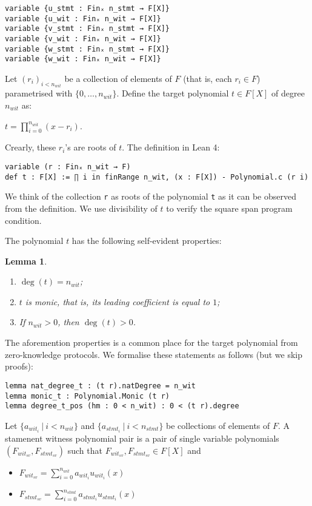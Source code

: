 \documentclass{article}
\newtheorem{lemma}{Lemma}
\theoremstyle{definition}
\theoremstyle{remark}
\begin{document}
\begin{lstlisting}
variable {u_stmt : Finₓ n_stmt → F[X]}
variable {u_wit : Finₓ n_wit → F[X]}
variable {v_stmt : Finₓ n_stmt → F[X]}
variable {v_wit : Finₓ n_wit → F[X]}
variable {w_stmt : Finₓ n_stmt → F[X]}
variable {w_wit : Finₓ n_wit → F[X]}
\end{lstlisting}

Let $(r_i)_{i < n_{wit}}$ be a collection of elements of $F$ (that is, each $r_i \in F$) parametrised with $\{0, \dots, n_{wit} \}$.
Define the target polynomial $t \in F[X]$ of degree $n_{wit}$ as:
\begin{center}
$t = \prod \limits_{i = 0}^{n_{wit}} (x - r_i)$.
\end{center}

Crearly, these $r_i$'s are roots of $t$. The definition in Lean 4:
\begin{lstlisting}
variable (r : Finₓ n_wit → F)
def t : F[X] := ∏ i in finRange n_wit, (x : F[X]) - Polynomial.c (r i)
\end{lstlisting}

We think of the collection \verb"r" as roots of the polynomial \verb"t" as it can be observed from the definition.
We use divisibility of $t$ to verify the square span program condition.

The polynomial $t$ has the following self-evident properties:

\begin{lemma}
$ $

\begin{enumerate}
\item $\deg(t) = n_{wit}$;
\item $t$ is monic, that is, its leading coefficient is equal to $1$;
\item If $n_{wit} > 0$, then $\deg(t) > 0$.
\end{enumerate}
\end{lemma}

The aforemention properties is a common place for the target polynomial from zero-knowledge protocols.
We formalise these statements as follows (but we skip proofs):
\begin{lstlisting}
lemma nat_degree_t : (t r).natDegree = n_wit
lemma monic_t : Polynomial.Monic (t r)
lemma degree_t_pos (hm : 0 < n_wit) : 0 < (t r).degree
\end{lstlisting}

Let $\{ a_{{wit}_i} \: | \: i < n_{wit}\}$ and $\{ a_{{stmt}_i} \: | \: i < n_{stmt} \}$ be collections of elements of $F$.
A stamenent witness polynomial pair is a pair of single variable polynomials $(F_{{wit}_{sv}}, F_{{stmt}_{sv}})$
such that $F_{{wit}_{sv}}, F_{{stmt}_{sv}} \in F[X]$ and
\begin{itemize}
\item $F_{{wit}_{sv}} = \sum \limits_{i = 0}^{n_{wit}} a_{{wit}_i} u_{{wit}_{i}}(x)$
\item $F_{{stmt}_{sv}} = \sum \limits_{i = 0}^{n_{stmt}} a_{{stmt}_i} u_{{stmt}_{i}}(x)$
\end{itemize}
\end{document}
